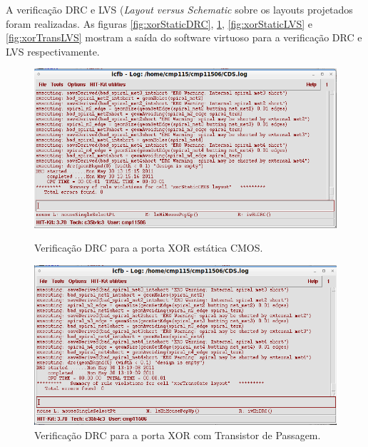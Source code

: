 \documentclass[a4paper,10pt] {article}
\begin{document}
A verificação DRC e LVS (\textit{Layout versus Schematic} sobre os layouts projetados foram realizadas.
As figuras \ref{fig:xorStaticDRC}, \ref{fig:xorTransDRC}, \ref{fig:xorStaticLVS} e \ref{fig:xorTransLVS} mostram a saída do software virtuoso para a verificação DRC e LVS respectivamente.

\begin{figure}[h]
  \begin{minipage} [b] {0.48 \linewidth}
	\centering
	\includegraphics[scale=0.2]{xorStaticCMOSdrc.png}
	\caption{Verificação DRC para a porta XOR estática CMOS.}
	\label{fig:xorStaticDRC}
  \end{minipage}
  \begin{minipage} [b] {0.48 \linewidth}
	\centering
	\includegraphics[scale=0.2]{xorTransGatedrc.png}
	\caption{Verificação DRC para a porta XOR com Transistor de Passagem.}
	\label{fig:xorTransDRC}
  \end{minipage}
\end{figure}
\end{document}
